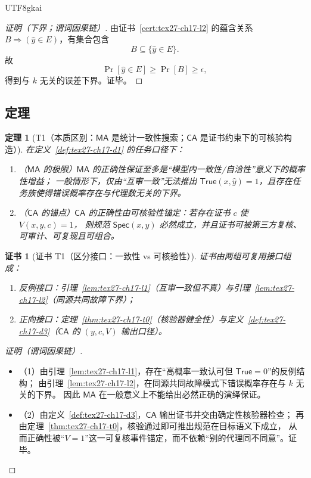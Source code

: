 \documentclass[12pt]{article}
\newtheorem{theorem}{定理}[section]
\newtheorem{Certificate}{证书}[section]
\begin{document}
\begin{CJK*}{UTF8}{gkai}
\begin{proof}[证明（下界；谓词因果链）]
由证书~\ref{cert:tex27-ch17-l2} 的蕴含关系 $B\Rightarrow(\hat y\in E)$，有集合包含
\[
  B\subseteq \{\hat y\in E\}.
\]
故
\[
  \Pr[\hat y\in E]\ge \Pr[B]\ge \epsilon,
\]
得到与 $k$ 无关的误差下界。证毕。
\end{proof}

\subsection{定理}
\label{subsec:tex27-ch17-theorems}

\begin{theorem}[T1（本质区别：$\mathsf{MA}$ 是统计一致性搜索；$\mathsf{CA}$ 是证书约束下的可核验构造）]
\label{thm:tex27-ch17-t1}
在定义~\ref{def:tex27-ch17-d1} 的任务口径下：
\begin{enumerate}
  \item（$\mathsf{MA}$ 的极限）$\mathsf{MA}$ 的正确性保证至多是“模型内一致性/自洽性”意义下的概率性增益；
  一般情形下，仅由“互审一致”无法推出 $\mathsf{True}(x,\hat y)=1$，且存在任务族使得错误概率存在与代理数无关的下界。
  \item（$\mathsf{CA}$ 的锚点）$\mathsf{CA}$ 的正确性由可核验性锚定：若存在证书 $c$ 使 $V(x,y,c)=1$，
  则规范 $\mathsf{Spec}(x,y)$ 必然成立，并且证书可被第三方复核、可审计、可复现且可组合。
\end{enumerate}
\end{theorem}

\begin{Certificate}[证书 T1（区分接口：一致性 vs 可核验性）]
\label{cert:tex27-ch17-t1}
证书由两组可复用接口组成：
\begin{enumerate}
  \item 反例接口：引理~\ref{lem:tex27-ch17-l1}（互审一致但不真）与引理~\ref{lem:tex27-ch17-l2}（同源共同故障下界）；
  \item 正向接口：定理~\ref{thm:tex27-ch17-t0}（核验器健全性）与定义~\ref{def:tex27-ch17-d3}（$\mathsf{CA}$ 的 $(y,c,V)$ 输出口径）。
\end{enumerate}
\end{Certificate}

\begin{proof}[证明（谓词因果链）]
\begin{itemize}
  \item（1）由引理~\ref{lem:tex27-ch17-l1}，存在“高概率一致认可但 $\mathsf{True}=0$”的反例结构；
  由引理~\ref{lem:tex27-ch17-l2}，在同源共同故障模式下错误概率存在与 $k$ 无关的下界。
  因此 $\mathsf{MA}$ 在一般意义上不能给出必然正确的演绎保证。
  \item（2）由定义~\ref{def:tex27-ch17-d3}，$\mathsf{CA}$ 输出证书并交由确定性核验器检查；
  再由定理~\ref{thm:tex27-ch17-t0}，核验通过即可推出规范在目标语义下成立，
  从而正确性被“$V=1$”这一可复核事件锚定，而不依赖“别的代理同不同意”。证毕。
\end{itemize}
\end{proof}


\end{CJK*}
\end{document}
